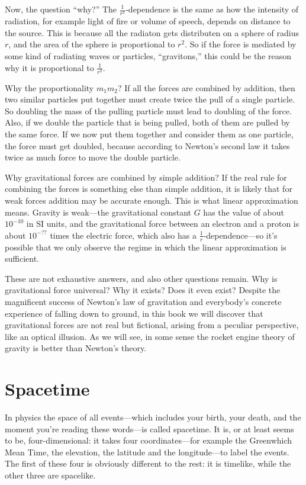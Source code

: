 \documentclass[11pt,oneside%
]{memoir}
\begin{document}
Now, the question ``why?'' The \(\frac{1}{r^2}\)-dependence is the same as how the intensity of radiation, for example light of fire or volume of speech, depends on distance to the source. This is because all the radiaton gets distributen on a sphere of radius \(r\), and the area of the sphere is proportional to \(r^2\). So if the force is mediated by some kind of radiating waves or particles, ``gravitons,'' this could be the reason why it is proportional to \(\frac{1}{r^2}\).

Why the proportionality \(m_1 m_2\)? If all the forces are combined by addition, then two similar particles put together must create twice the pull of a single particle. So doubling the mass of the pulling particle must lead to doubling of the force. Also, if we double the particle that is being pulled, both of them are pulled by the same force. If we now put them together and consider them as one particle, the force must get doubled, because according to Newton's second law it takes twice as much force to move the double particle.

Why gravitational forces are combined by simple addition? If the real rule for combining the forces is something else than simple addition, it is likely that for weak forces addition may be accurate enough. This is what linear approximation means. Gravity is weak---the gravitational constant \(G\) has the value of about \(10^{-10}\) in SI units, and the gravitational force between an electron and a proton is about \(10^{-??}\) times the electric force, which also has a \(\frac{1}{r}\)-dependence---so it's possible that we only observe the regime in which the linear approximation is sufficient.

These are not exhaustive answers, and also other questions remain. Why is gravitational force universal? Why it exists? Does it even exist? Despite the magnificent success of Newton's law of gravitation and everybody's concrete experience of falling down to ground, in this book we will discover that gravitational forces are not real but fictional, arising from a peculiar perspective, like an optical illusion. As we will see, in some sense the rocket engine theory of gravity is better than Newton's theory.

\mainmatter
\chapter{Spacetime}

In physics the space of all events---which includes your birth, your death, and the moment you're reading these words---is called spacetime. It is, or at least seems to be, four-dimensional: it takes four coordinates---for example the Greenwhich Mean Time, the elevation, the latitude and the longitude---to label the events. The first of these four is obviously different to the rest: it is timelike, while the other three are spacelike.
\end{document}
